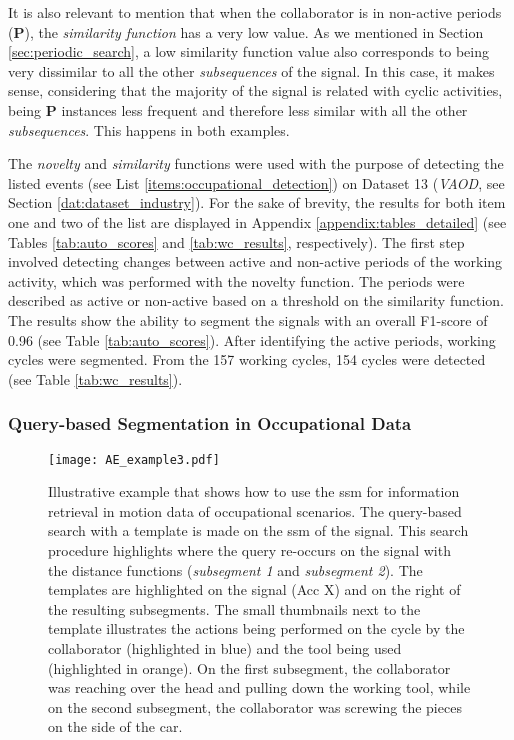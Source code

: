 It is also relevant to mention that when the collaborator is in non-active periods (\textbf{P}), the \textit{similarity function} has a very low value. As we mentioned in Section \ref{sec:periodic_search}, a low similarity function value also corresponds to being very dissimilar to all the other \textit{subsequences} of the signal. In this case, it makes sense, considering that the majority of the signal is related with cyclic activities, being \textbf{P} instances less frequent and therefore less similar with all the other \textit{subsequences}. This happens in both examples.

The \textit{novelty} and \textit{similarity} functions were used with the purpose of detecting the listed events (see List \ref{items:occupational_detection}) on Dataset 13 (\textit{VAOD}, see Section \ref{dat:dataset_industry}). For the sake of brevity, the results for both item one and two of the list are displayed in Appendix \ref{appendix:tables_detailed} (see Tables \ref{tab:auto_scores} and \ref{tab:wc_results}, respectively). The first step involved detecting changes between active and non-active periods of the working activity, which was performed with the novelty function. The periods were described as active or non-active based on a threshold on the similarity function. The results show the ability to segment the signals with an overall F1-score of 0.96 (see Table \ref{tab:auto_scores}). After identifying the active periods, working cycles were segmented. From the 157 working cycles, 154 cycles were detected (see Table \ref{tab:wc_results}). 

\subsubsection{Query-based Segmentation in Occupational Data}

\begin{figure}
  \centering
      \texttt{[image: AE\_example3.pdf]}
  \caption{Illustrative example that shows how to use the \gls{ssm} for information retrieval in motion data of occupational scenarios. The query-based search with a template is made on the \gls{ssm} of the signal. This search procedure highlights where the query re-occurs on the signal with the distance functions (\textit{subsegment 1} and \textit{subsegment 2}). The templates are highlighted on the signal (Acc X) and on the right of the resulting subsegments. The small thumbnails next to the template illustrates the actions being performed on the cycle by the collaborator (highlighted in blue) and the tool being used (highlighted in orange). On the first subsegment, the collaborator was reaching over the head and pulling down the working tool, while on the second subsegment, the collaborator was screwing the pieces on the side of the car.}
  \label{fig:ae_example3}
\end{figure}

